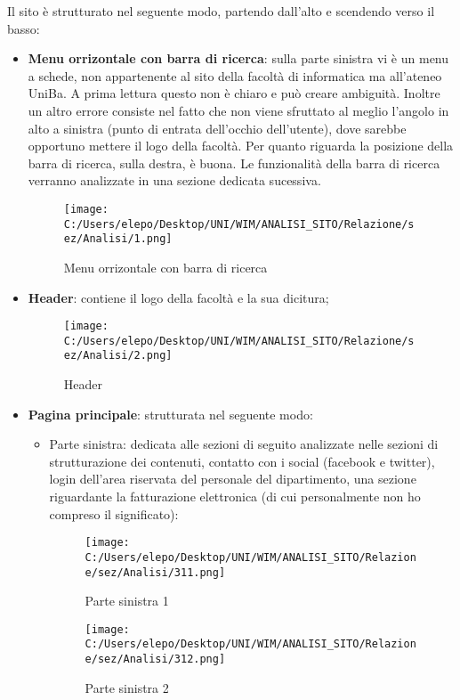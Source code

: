Il sito è strutturato nel seguente modo, partendo dall'alto e scendendo verso il basso:
	\begin{itemize}
		\item \textbf{Menu orrizontale con barra di ricerca}: sulla parte sinistra vi è un menu a schede, non appartenente al sito della facoltà di informatica ma all'ateneo UniBa. A prima lettura questo non è chiaro e può creare ambiguità. Inoltre un altro errore consiste nel fatto che non viene sfruttato al meglio l'angolo in alto a sinistra (punto di entrata dell'occhio dell'utente), dove sarebbe opportuno mettere il logo della facoltà. Per quanto riguarda la posizione della barra di ricerca, sulla destra, è buona. Le funzionalità della barra di ricerca verranno analizzate in una sezione dedicata sucessiva.
\begin{center}
\begin{figure}[h!]
           \begin{center}
           \texttt{[image: C:/Users/elepo/Desktop/UNI/WIM/ANALISI\_SITO/Relazione/sez/Analisi/1.png]}
           \caption{Menu orrizontale con barra di ricerca}
           \end{center}
  \end{figure}
\end{center}
		\item \textbf{Header}: contiene il logo della facoltà e la sua dicitura;
		\begin{center}
\begin{figure}[h!]
           \begin{center}
           \texttt{[image: C:/Users/elepo/Desktop/UNI/WIM/ANALISI\_SITO/Relazione/sez/Analisi/2.png]}
           \caption{Header}
           \end{center}
  \end{figure}
\end{center}
		\item \textbf{Pagina principale}: strutturata nel seguente modo:
			\begin{itemize}
				\item Parte sinistra: dedicata alle sezioni di seguito analizzate nelle sezioni di strutturazione dei contenuti, contatto con i social (facebook e twitter), login dell'area riservata del personale del dipartimento, una sezione riguardante la fatturazione elettronica (di cui personalmente non ho compreso il significato):
\begin{figure}[!htb]
   \begin{minipage}{0.48\textwidth}
     \centering
     \texttt{[image: C:/Users/elepo/Desktop/UNI/WIM/ANALISI\_SITO/Relazione/sez/Analisi/311.png]}
     \caption{Parte sinistra 1}
   \end{minipage}\hfill
   \begin{minipage}{0.48\textwidth}
     \centering
     \texttt{[image: C:/Users/elepo/Desktop/UNI/WIM/ANALISI\_SITO/Relazione/sez/Analisi/312.png]}
     \caption{Parte sinistra 2}
   \end{minipage}
\end{figure}	
		

\end{itemize}
\end{itemize}
